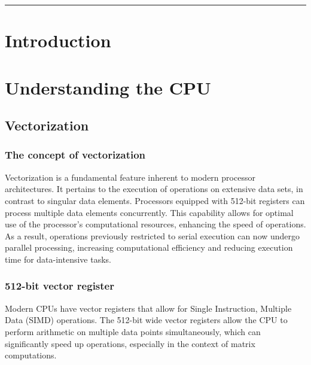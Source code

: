 \documentclass{article}
\begin{document}
\begin{center}
		\rule{.9\textwidth}{0.4pt}%
	\end{center}




\section{Introduction}
\newpage
\section{Understanding the CPU}

    \subsection{Vectorization}

        \subsubsection{The concept of vectorization} 
        Vectorization is a fundamental feature inherent to modern processor architectures. It pertains to the execution of operations on extensive data sets, in contrast to singular data elements. Processors equipped with 512-bit registers can process multiple data elements concurrently. This capability allows for optimal use of the processor’s computational resources, enhancing the speed of operations. As a result, operations previously restricted to serial execution can now undergo parallel processing, increasing computational efficiency and reducing execution time for data-intensive tasks. 

        \subsubsection{512-bit vector register}
        Modern CPUs have vector registers that allow for Single Instruction, Multiple Data (SIMD) operations. The 512-bit wide vector registers allow the CPU to perform arithmetic on multiple data points simultaneously, which can significantly speed up operations, especially in the context of matrix computations.
        
\end{document}
